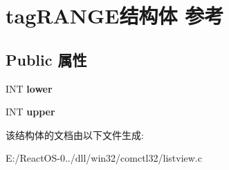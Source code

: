 \hypertarget{structtag_r_a_n_g_e}{}\section{tag\+R\+A\+N\+G\+E结构体 参考}
\label{structtag_r_a_n_g_e}
\subsection*{Public 属性}
\begin{DoxyCompactItemize}
\item 
\mbox{\label{structtag_r_a_n_g_e_ae1d3fe6d7b38f9b00d39a4a6a6b429dd}} 
I\+NT {\bfseries lower}
\item 
\mbox{\label{structtag_r_a_n_g_e_a68f37143a38ed51d60521211982cbd8a}} 
I\+NT {\bfseries upper}
\end{DoxyCompactItemize}


该结构体的文档由以下文件生成\+:\begin{DoxyCompactItemize}
\item 
E\+:/\+React\+O\+S-\/0../dll/win32/comctl32/listview.\+c\end{DoxyCompactItemize}
